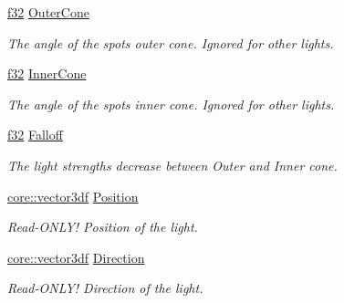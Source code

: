 \begin{DoxyCompactItemize}
\mbox{\label{structirr_1_1video_1_1SLight_a38ee805b9145d4ab1b1a889bbded9adc}} 
\hyperlink{namespaceirr_a0277be98d67dc26ff93b1a6a1d086b07}{f32} \hyperlink{structirr_1_1video_1_1SLight_a38ee805b9145d4ab1b1a889bbded9adc}{Outer\+Cone}
\begin{DoxyCompactList}\small\item\em The angle of the spot\textquotesingle{}s outer cone. Ignored for other lights. \end{DoxyCompactList}\item 
\mbox{\label{structirr_1_1video_1_1SLight_ab079c170fbab1e0a191e8801839d6c83}} 
\hyperlink{namespaceirr_a0277be98d67dc26ff93b1a6a1d086b07}{f32} \hyperlink{structirr_1_1video_1_1SLight_ab079c170fbab1e0a191e8801839d6c83}{Inner\+Cone}
\begin{DoxyCompactList}\small\item\em The angle of the spot\textquotesingle{}s inner cone. Ignored for other lights. \end{DoxyCompactList}\item 
\mbox{\label{structirr_1_1video_1_1SLight_a38cea8db5e6951a9d98802f2f249129d}} 
\hyperlink{namespaceirr_a0277be98d67dc26ff93b1a6a1d086b07}{f32} \hyperlink{structirr_1_1video_1_1SLight_a38cea8db5e6951a9d98802f2f249129d}{Falloff}
\begin{DoxyCompactList}\small\item\em The light strength\textquotesingle{}s decrease between Outer and Inner cone. \end{DoxyCompactList}\item 
\hyperlink{namespaceirr_1_1core_ae6e2b2a6c552833ebbd5b7463d03586b}{core\+::vector3df} \hyperlink{structirr_1_1video_1_1SLight_ac1f0fda0cc1780b09a2597adcfc9c946}{Position}
\begin{DoxyCompactList}\small\item\em Read-\/\+O\+N\+L\+Y! Position of the light. \end{DoxyCompactList}\item 
\hyperlink{namespaceirr_1_1core_ae6e2b2a6c552833ebbd5b7463d03586b}{core\+::vector3df} \hyperlink{structirr_1_1video_1_1SLight_a226c488abec5696b995df6895ab42d41}{Direction}
\begin{DoxyCompactList}\small\item\em Read-\/\+O\+N\+L\+Y! Direction of the light. \end{DoxyCompactList}\item 

\end{DoxyCompactItemize}
